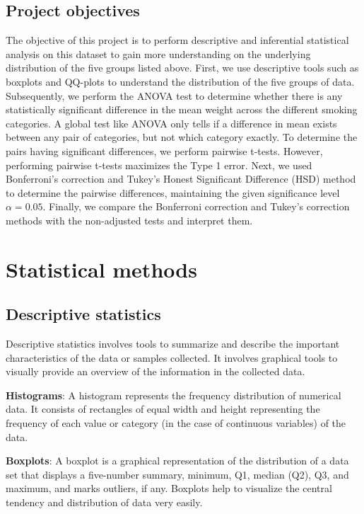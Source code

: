 \documentclass[fontsize=12 pt]{scrartcl}
\begin{document}
\subsection{Project objectives}
The objective of this project is to perform descriptive and inferential statistical analysis on this dataset to gain more understanding on the underlying distribution of the five groups listed above.
First, we use descriptive tools such as boxplots and QQ-plots to understand the distribution of the five groups of data.
Subsequently, we perform the ANOVA test to determine whether there is any statistically significant difference in the mean weight across the different smoking categories.
A global test like ANOVA only tells if a difference in mean exists between any pair of categories, but not which category exactly. To determine the pairs having significant differences, we perform pairwise t-tests. However, performing pairwise t-tests maximizes the Type 1 error. Next, we used Bonferroni's correction and Tukey’s Honest Significant Difference (HSD) method to determine the pairwise differences, maintaining the given significance level $\alpha = 0.05 $. Finally, we compare the Bonferroni correction and Tukey's correction methods with the non-adjusted tests and interpret them.  


\section{Statistical methods}

\subsection{Descriptive statistics}

Descriptive statistics involves tools to summarize and describe the important characteristics of the data or samples collected. It involves graphical tools to visually provide an overview of the information in the collected data.

\textbf{Histograms}: A histogram represents the frequency distribution of numerical data. It consists of rectangles of equal width and height representing the frequency of each value or category (in the case of continuous variables) of the data.  

\textbf{Boxplots}:  A boxplot is a graphical representation of the distribution of a data set that displays a five-number summary, minimum, Q1, median (Q2), Q3, and maximum, and marks outliers, if any. Boxplots help to visualize the central tendency and distribution of data very easily.
\end{document}
